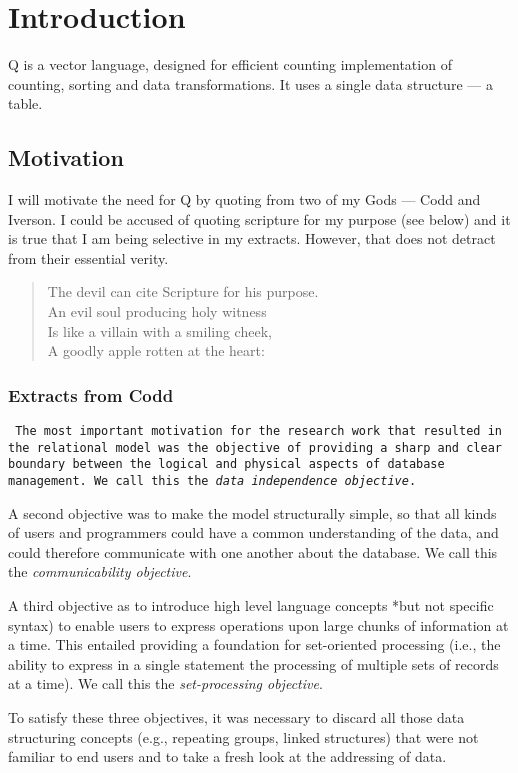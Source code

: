 
\newcommand{\YES}{\checkmark}


\section{Introduction}

Q is a vector language, designed for efficient counting implementation
of counting, sorting and data transformations. It uses a single data
structure --- a table.

\subsection{Motivation}

I will motivate the need for Q by quoting from two of my Gods --- Codd and
Iverson. I could be accused of quoting scripture for my purpose (see
below) and it is true that I am being selective in my extracts.
However, that does not detract from their essential verity.

\begin{verse}
The devil can cite Scripture for his purpose. \\ 
An evil soul producing holy witness \\ 
Is like a villain with a smiling cheek, \\
A goodly apple rotten at the heart:
\end{verse}

\subsubsection{Extracts from Codd}

{\tt 
The most important motivation for the research work that resulted in the
relational model was the objective of providing a sharp and clear
boundary between the logical and physical aspects of database
management. We call this the {\em data independence objective}.

A second objective was to make the model structurally simple, so that
all kinds of users and programmers could have a common understanding of
the data, and could therefore communicate with one another about the
database. We call this the {\em communicability objective}.

A third objective as to introduce high level language concepts *but not
specific syntax) to enable users to express operations upon large chunks
of information at a time. This entailed providing a foundation for
set-oriented processing (i.e., the ability to express in a single
statement the processing of multiple sets of records at a time). We
call this the {\em set-processing objective}.

To satisfy these three objectives, it was necessary to discard all those
data structuring concepts (e.g., repeating groups, linked structures)
that were not familiar to end users and to take a fresh look at
the addressing of data.
}

